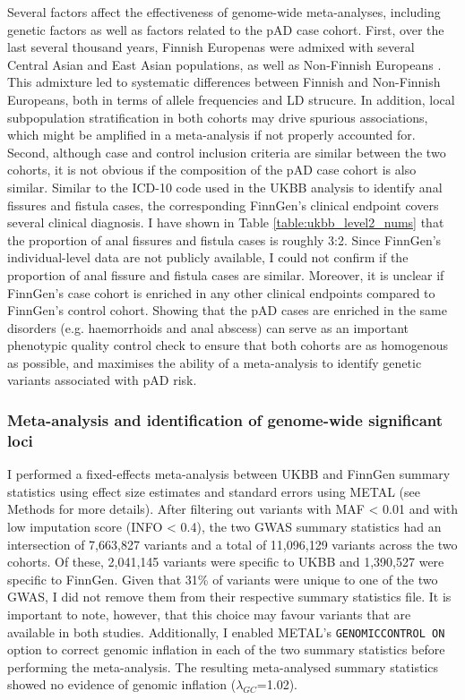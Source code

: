     Several factors affect the effectiveness of genome-wide meta-analyses, including genetic factors as well as factors related to the pAD case cohort. First, over the last several thousand years, Finnish Europenas were admixed with several Central Asian and East Asian populations, as well as Non-Finnish Europeans \cite{Qin2015-jb}. This admixture led to systematic differences between Finnish and Non-Finnish Europeans, both in terms of allele frequencies and LD strucure.  In addition, local subpopulation stratification in both cohorts may drive spurious associations, which might be amplified in a meta-analysis if not properly accounted for. Second, although case and control inclusion criteria are similar between the two cohorts, it is not obvious if the composition of the pAD case cohort is also similar. Similar to the ICD-10 code used in the UKBB analysis to identify anal fissures and fistula cases, the corresponding FinnGen's clinical endpoint covers several clinical diagnosis. I have shown in Table \ref{table:ukbb_level2_nums} that the proportion of anal fissures and fistula cases is roughly 3:2. Since FinnGen's individual-level data are not publicly available, I could not confirm if the proportion of anal fissure and fistula cases are similar. Moreover, it is unclear if FinnGen's case cohort is enriched in any other clinical endpoints compared to FinnGen's control cohort. Showing that the pAD cases are enriched in the same disorders (e.g. haemorrhoids and anal abscess) can serve as an important phenotypic quality control check to ensure that both cohorts are as homogenous as possible, and maximises the ability of a meta-analysis to identify genetic variants associated with pAD risk.

    \subsubsection{Meta-analysis and identification of genome-wide significant loci}
    I performed a fixed-effects meta-analysis between UKBB and FinnGen summary statistics using effect size estimates and standard errors using METAL (see Methods for more details). After filtering out variants with MAF < 0.01 and with low imputation score (INFO < 0.4), the two GWAS summary statistics had an intersection of 7,663,827 variants and a total of 11,096,129 variants across the two cohorts. Of these, 2,041,145 variants were specific to UKBB and 1,390,527 were specific to FinnGen. Given that 31\% of variants were unique to one of the two GWAS, I did not remove them from their respective summary statistics file. It is important to note, however, that this choice may favour variants that are available in both studies. Additionally, I enabled METAL's \Verb+GENOMICCONTROL ON+ option to correct genomic inflation in each of the two summary statistics before performing the meta-analysis. The resulting meta-analysed summary statistics showed no evidence of genomic inflation ($\lambda_{GC}$=1.02).\\


